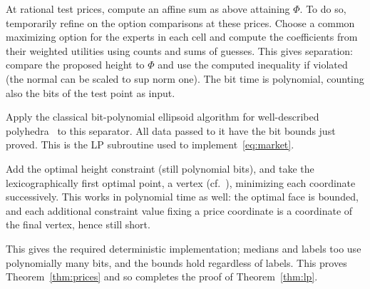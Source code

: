 At rational test prices, compute an affine sum as above attaining
\(\Phi\).
To do so, temporarily refine on the option comparisons at
these prices. Choose a common maximizing option for the experts
in each cell and compute the coefficients from their weighted utilities
using counts and sums of guesses.
This gives separation: compare the proposed height to \(\Phi\)
and use the computed inequality if violated (the normal can be
scaled to sup norm one).
The bit time is polynomial, counting also the bits of the test point
as input.

Apply the classical bit-polynomial ellipsoid algorithm for
well-described polyhedra~\cite[Theorem~(6.4.9)]{GLS} to this separator.
All data passed to it have the bit bounds just proved. This is the
LP subroutine used to implement~\eqref{eq:market}.

Add the optimal height constraint
(still polynomial bits), and take
the lexicographically first optimal point,
a vertex (cf.~\cite[Lemma~(6.5.1)]{GLS}),
minimizing each coordinate successively.
This works in polynomial time as well:
the optimal face is bounded,
and each additional constraint value fixing a price coordinate
is a coordinate of the final vertex,
hence still short.

This gives the required deterministic implementation;
medians and labels too use polynomially many bits,
and the bounds hold regardless of labels.
This proves Theorem~\ref{thm:prices} and so completes
the proof of Theorem~\ref{thm:lp}.
